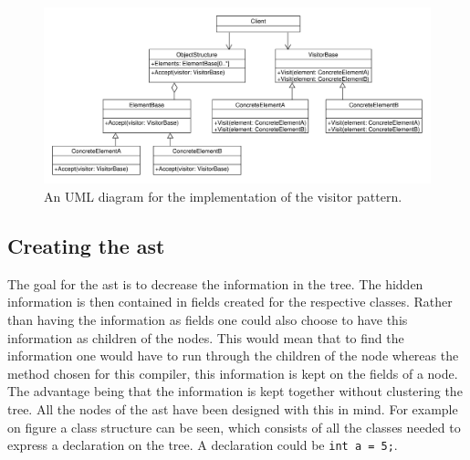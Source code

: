 \begin{figure}[!ht]
\centering
 \includegraphics[width=1\textwidth]{figures/ClassDiagrams/VisitorPattern.pdf} %
\caption{An UML diagram for the implementation of the visitor pattern.}\label{image:visitor}
\vspace{-15pt}
\end{figure}

\subsection{Creating the \acrshort{ast}}\label{CreatingAst}

The goal for the \acrshort{ast} is to decrease the information in the tree.
The hidden information is then contained in fields created for the respective classes.
Rather than having the information as fields one could also choose to have this information as children of the nodes.
This would mean that to find the information one would have to run through the children of the node whereas the method chosen for this compiler, this information is kept on the fields of a node.
The advantage being that the information is kept together without clustering the tree.
All the nodes of the \acrshort{ast} have been designed with this in mind.
For example on figure  a class structure can be seen, which consists of all the classes needed to express a declaration on the tree.
A declaration could be \texttt{int a = 5;}.


